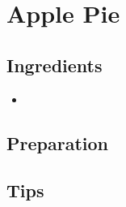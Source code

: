 \thispagestyle{fancy}
\section{Apple Pie} \label{applepie}
\AddToShipoutPicture*{\ApplePie}


\subsection*{Ingredients}

\begin{multicols}{3}
	\begin{itemize}
		\item 
	\end{itemize}
\end{multicols}

\subsection*{Preparation}


\subsection*{Tips}

